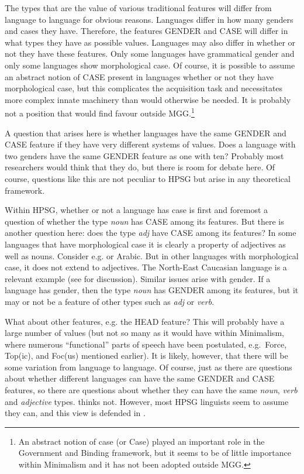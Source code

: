 \documentclass[output=paper]{langsci/langscibook}
\begin{document}
The types that are the value of various traditional features will differ from
language to language for obvious reasons. Languages differ in how many genders
and cases they have. Therefore, the features GENDER and CASE will differ in
what types they have as possible values. Languages may also differ in whether
or not they have these features. Only some languages have grammatical gender
and only some languages show morphological case. Of course, it is possible to
assume an abstract notion of CASE present in languages whether or not they have
morphological case, but this complicates the acquisition task and necessitates
more complex innate machinery than would otherwise be needed. It is probably
not a position that would find favour outside MGG.\footnote{An abstract notion
of case (or Case) played an important role in the Government and Binding
framework, but it seems to be of little importance within Minimalism and it has
not been adopted outside \gls{MGG}.}

A question that arises here is whether languages have the same GENDER and CASE
feature if they have very different systems of values. Does a language with two
genders have the same GENDER feature as one with ten? Probably most researchers
would think that they do, but there is room for debate here. Of course,
questions like this are not peculiar to \gls{HPSG} but arise in any theoretical
framework.

Within \gls{HPSG}, whether or not a language has case is first and foremost a
question of whether the type \emph{noun} has CASE among its features. But there
is another question here: does the type \emph{adj} have CASE among its
features?  In some languages that have morphological case it is clearly a
property of adjectives as well as nouns. Consider e.g.  or Arabic.
But in other languages with morphological case, it does not extend to
adjectives. The North-East Caucasian language  is a relevant example
(see \citealt{BonBroChuCor2016} for discussion). Similar issues arise with
gender. If a language has gender, then the type \emph{noun} has GENDER among
its features, but it may or not be a feature of other types such as \emph{adj} or
\emph{verb}.

What about other features, e.g. the HEAD feature? This will probably have a
large number of values (but not so many as it would have within Minimalism,
where numerous \enquote{functional} parts of speech have been postulated, e.g.\
Force, Top(ic), and Foc(us) mentioned earlier). It is
likely, however, that there will be some variation from language to language.
Of course, just as there are questions about whether different languages can
have the same GENDER and CASE features,\is{case!case features} so there are questions about whether
they can have the same \emph{noun}, \emph{verb} and \emph{adjective} types.
\citet{Haspelmath2010} thinks not. However, most \gls{HPSG} linguists seem to
assume they can, and this view is defended in \textcite[Ch.\ 2.2]{Muller2015}.
\end{document}
